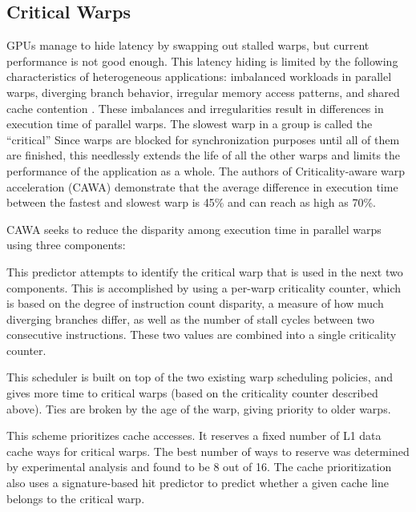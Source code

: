 \documentclass[prodmode,acmtecs]{acmsmall} %
\begin{document}
\subsection{Critical Warps}
GPUs manage to hide latency by swapping out stalled warps, but current
performance is not good enough. This latency hiding is limited by the following
characteristics of heterogeneous applications: imbalanced workloads in parallel
warps, diverging branch behavior, irregular memory access patterns, and shared
cache contention \cite{CoordinatedWarpScheduling}. These imbalances and
irregularities result in differences in execution time of parallel warps. The
slowest warp in a group is called the ``critical'' Since warps are blocked for
synchronization purposes until all of them are finished, this needlessly extends
the life of all the other warps and limits the performance of the application as
a whole. The authors of Criticality-aware warp acceleration (CAWA) demonstrate
that the average difference in execution time between the fastest and slowest
warp is 45\% and can reach as high as 70\%.

CAWA seeks to reduce the disparity among execution time in parallel warps using
three components:
\begin{description}
  \setlength\itemsep{0.5em}
  \item[Dynamic warp criticality prediction] This predictor attempts to identify
  the critical warp that is used in the next two components. This is
  accomplished by using a per-warp criticality counter, which is based on the
  degree of instruction count disparity, a measure of how much diverging
  branches differ, as well as the number of stall cycles between two consecutive
  instructions. These two values are combined into a single criticality counter.
  \item[A greedy criticality-aware warp scheduler] This scheduler is built on
  top of the two existing warp scheduling policies, and gives more time to
  critical warps (based on the criticality counter described above). Ties are
  broken by the age of the warp, giving priority to older warps.
  \item[Criticality-aware cache prioritization] This scheme prioritizes cache
  accesses. It reserves a fixed number of L1 data cache ways for critical warps.
  The best number of ways to reserve was determined by experimental analysis and
  found to be 8 out of 16. The cache prioritization also uses a signature-based
  hit predictor to predict whether a given cache line belongs to the critical
  warp.
\end{description}
\end{document}
